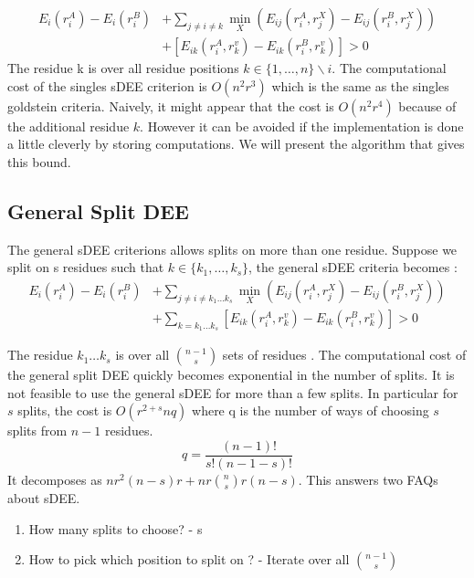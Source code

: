 \documentclass{article}
\begin{document}
\begin{equation}
\label{eqn:sDEE_singles}
\begin{split}
E_i(r_i^A) - E_i(r_i^B) &+ \sum_{j\neq i \neq k} \min_X \left(E_{ij}(r_i^A,r_j^X)-E_{ij}(r_i^B,r_j^X) \right)\\
&+ \left[E_{ik}(r_i^A,r_k^v)-E_{ik}(r_i^B,r_k^v)\right] > 0 
\end{split}
\end{equation}
The residue k is over all residue positions $k \in \{1,\dots, n\}\backslash i$. The computational cost of the singles sDEE criterion is $O(n^2r^3)$ which is the same as the singles goldstein criteria. Naively, it might appear that the cost is $O(n^2r^4)$ because of the additional residue $k$. However it can be avoided if the implementation is done a little cleverly by storing computations. We will present the algorithm that gives this bound. 

\subsection{General Split DEE}
The general sDEE criterions allows splits on more than one residue. Suppose we split on s residues such that $k \in \{k_1,\dots,k_s\}$, the general sDEE criteria becomes :
\begin{equation}
\label{eqn:sDEE_gen}
\begin{split}
E_i(r_i^A) - E_i(r_i^B) &+ \sum_{j\neq i \neq k_1\dots k_s} \min_X \left(E_{ij}(r_i^A,r_j^X)-E_{ij}(r_i^B,r_j^X) \right)\\
&+ \sum_{k=k_1\dots k_s}\left[E_{ik}(r_i^A,r_k^v)-E_{ik}(r_i^B,r_k^v)\right] > 0 
\end{split}
\end{equation}

The residue $k_1\dots k_s$ is over all $n-1 \choose s$ sets of residues . The computational cost of the general split DEE quickly becomes exponential in the number of splits.  It is not feasible to use the general sDEE for more than a few splits. In particular for $s$ splits, the cost is $O(r^{2+s}nq)$  where q is the number of ways of choosing $s$ splits from $n-1$ residues.
\[
q = \frac{(n-1)!}{s!(n-1-s)!}
\]
It decomposes as $nr^2(n-s)r + nr{n\choose s}r(n-s)$. This answers two FAQs about sDEE. 
\begin{enumerate}
\item How many splits to choose? - s
\item How to pick which position to split on ? - Iterate over all $n-1 \choose s$
\end{enumerate}
\end{document}
